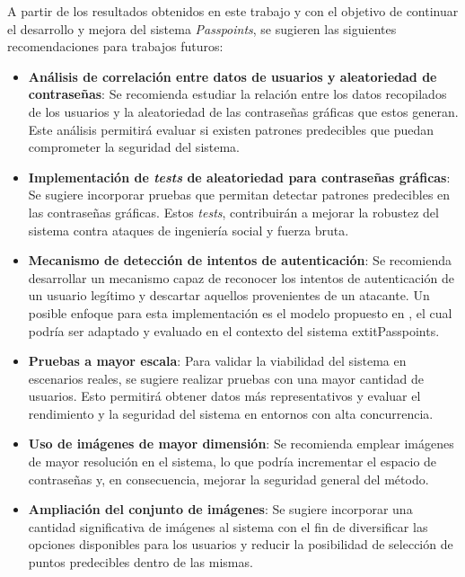 \begin{recomendations}
   A partir de los resultados obtenidos en este trabajo y con el objetivo de continuar el desarrollo y mejora del sistema \textit{Passpoints}, se sugieren las siguientes recomendaciones para trabajos futuros:
   
   \begin{itemize}
   	\item 	\textbf{Análisis de correlación entre datos de usuarios y aleatoriedad de contraseñas}: Se recomienda estudiar la relación entre los datos recopilados de los usuarios y la aleatoriedad de las contraseñas gráficas que estos generan. Este análisis permitirá evaluar si existen patrones predecibles que puedan comprometer la seguridad del sistema.
   	
   	\item 	\textbf{Implementación de \textit{tests} de aleatoriedad para contraseñas gráficas}: Se sugiere incorporar pruebas que permitan detectar patrones predecibles en las contraseñas gráficas. Estos \textit{tests}, contribuirán a mejorar la robustez del sistema contra ataques de ingeniería social y fuerza bruta.
   	
   	\item 	\textbf{Mecanismo de detección de intentos de autenticación}: Se recomienda desarrollar un mecanismo capaz de reconocer los intentos de autenticación de un usuario legítimo y descartar aquellos provenientes de un atacante. Un posible enfoque para esta implementación es el modelo propuesto en \cite{legon2019nuevo}, el cual podría ser adaptado y evaluado en el contexto del sistema 	extit{Passpoints}.
   	
   	\item 	\textbf{Pruebas a mayor escala}: Para validar la viabilidad del sistema en escenarios reales, se sugiere realizar pruebas con una mayor cantidad de usuarios. Esto permitirá obtener datos más representativos y evaluar el rendimiento y la seguridad del sistema en entornos con alta concurrencia.
   	
   	\item 	\textbf{Uso de imágenes de mayor dimensión}: Se recomienda emplear imágenes de mayor resolución en el sistema, lo que podría incrementar el espacio de contrase\~nas y, en consecuencia, mejorar la seguridad general del método.
   	
   	\item 	\textbf{Ampliación del conjunto de imágenes}: Se sugiere incorporar una cantidad significativa de imágenes al sistema con el fin de diversificar las opciones disponibles para los usuarios y reducir la posibilidad de selección de puntos predecibles dentro de las mismas.
   	
   \end{itemize}
\end{recomendations}

